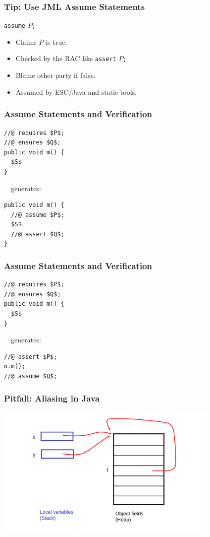 \begin{frame}[fragile]
\frametitle{Tip: Use JML Assume Statements}

\lstinline!assume! $P$\texttt{;}

\begin{itemize}
\item
Claims $P$ is true.

\item
Checked by the RAC like \lstinline!assert! $P$\texttt{;}

\item
Blame other party if false.

\item
Assumed by ESC/Java and static tools.
\end{itemize}
\end{frame}

\begin{frame}[fragile]
\frametitle{Assume Statements and Verification}

\begin{lstlisting}[mathescape=true]
//@ requires $P$;
//@ ensures $Q$;
public void m() {
  $S$
}
\end{lstlisting}

~~generates:

\begin{lstlisting}[mathescape=true]
public void m() {
  //@ assume $P$;
  $S$
  //@ assert $Q$;
}
\end{lstlisting}
\end{frame}

\begin{frame}[fragile]
\frametitle{Assume Statements and Verification}

\begin{lstlisting}[mathescape=true]
//@ requires $P$;
//@ ensures $Q$;
public void m() {
  $S$
}
\end{lstlisting}

~~generates:

\begin{lstlisting}[mathescape=true]
//@ assert $P$;
o.m();
//@ assume $Q$;
\end{lstlisting}

\end{frame}

\begin{frame}
\frametitle{Pitfall: Aliasing in Java}
\includegraphics[width=4.25in]{aliasxy}
\end{frame}

